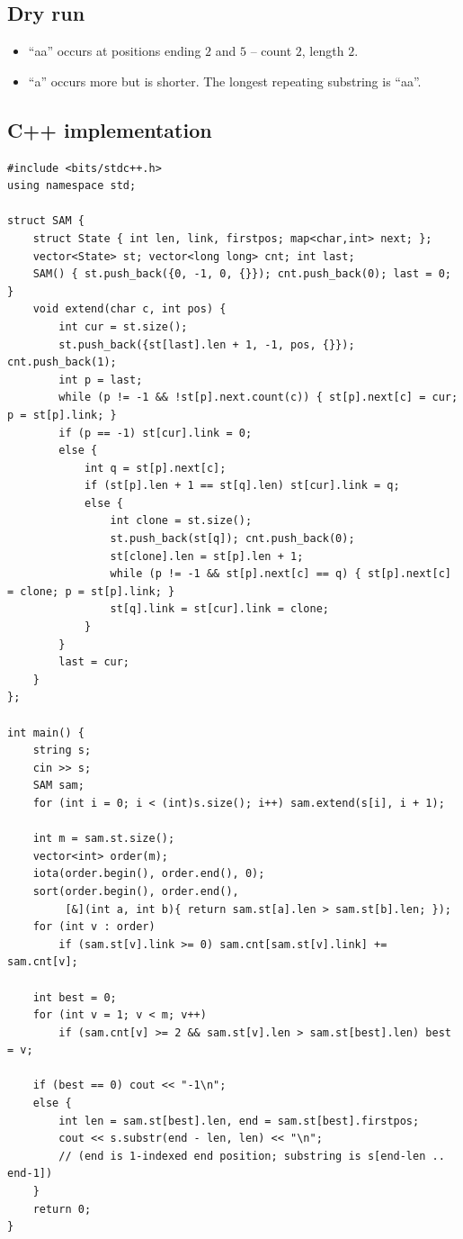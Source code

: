 \subsection*{Dry run}


\begin{itemize}
  \item ``aa'' occurs at positions ending $2$ and $5$ -- count $2$,
        length $2$.
  \item ``a'' occurs more but is shorter. The longest repeating substring
        is ``aa''.
\end{itemize}

\subsection*{C++ implementation}

\begin{lstlisting}
#include <bits/stdc++.h>
using namespace std;

struct SAM {
    struct State { int len, link, firstpos; map<char,int> next; };
    vector<State> st; vector<long long> cnt; int last;
    SAM() { st.push_back({0, -1, 0, {}}); cnt.push_back(0); last = 0; }
    void extend(char c, int pos) {
        int cur = st.size();
        st.push_back({st[last].len + 1, -1, pos, {}}); cnt.push_back(1);
        int p = last;
        while (p != -1 && !st[p].next.count(c)) { st[p].next[c] = cur; p = st[p].link; }
        if (p == -1) st[cur].link = 0;
        else {
            int q = st[p].next[c];
            if (st[p].len + 1 == st[q].len) st[cur].link = q;
            else {
                int clone = st.size();
                st.push_back(st[q]); cnt.push_back(0);
                st[clone].len = st[p].len + 1;
                while (p != -1 && st[p].next[c] == q) { st[p].next[c] = clone; p = st[p].link; }
                st[q].link = st[cur].link = clone;
            }
        }
        last = cur;
    }
};

int main() {
    string s;
    cin >> s;
    SAM sam;
    for (int i = 0; i < (int)s.size(); i++) sam.extend(s[i], i + 1);

    int m = sam.st.size();
    vector<int> order(m);
    iota(order.begin(), order.end(), 0);
    sort(order.begin(), order.end(),
         [&](int a, int b){ return sam.st[a].len > sam.st[b].len; });
    for (int v : order)
        if (sam.st[v].link >= 0) sam.cnt[sam.st[v].link] += sam.cnt[v];

    int best = 0;
    for (int v = 1; v < m; v++)
        if (sam.cnt[v] >= 2 && sam.st[v].len > sam.st[best].len) best = v;

    if (best == 0) cout << "-1\n";
    else {
        int len = sam.st[best].len, end = sam.st[best].firstpos;
        cout << s.substr(end - len, len) << "\n";
        // (end is 1-indexed end position; substring is s[end-len .. end-1])
    }
    return 0;
}
\end{lstlisting}

